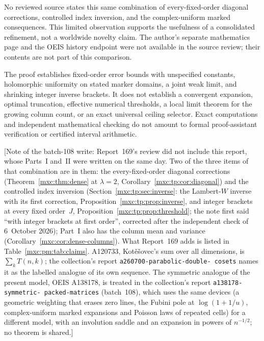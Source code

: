 \documentclass[11pt]{article}
\numberwithin{equation}{section}
\theoremstyle{definition}
\theoremstyle{remark}
\begin{document}
No reviewed source states this same combination of every-fixed-order diagonal
corrections, controlled index inversion, and the complex-uniform marked
consequences. This limited observation supports the usefulness of a
consolidated refinement, not a worldwide novelty claim. The author's separate
mathematics page and the OEIS history endpoint were not available in the
source review; their contents are not part of this comparison.

The proof establishes fixed-order error bounds with unspecified constants,
holomorphic uniformity on stated marker domains, a joint weak limit, and
shrinking integer inverse brackets. It does not establish a convergent
expansion, optimal truncation, effective numerical thresholds, a local limit
theorem for the growing column count, or an exact universal ceiling selector.
Exact computations and independent mathematical checking do not amount to
formal proof-assistant verification or certified interval arithmetic.

[Note of the batch-108 write: Report~169's review did not include this
report, whose Parts~I and~II were written on the same day. Two of the three
items of that combination are in them: the every-fixed-order diagonal
corrections (Theorem~\ref{mxc:thm:dense} at $\lambda=2$,
Corollary~\ref{mxc:tp:cor:diagonal}) and the controlled index inversion
(Section~\ref{mxc:tp:sec:inverse}: the Lambert-$W$ inverse with its first
correction, Proposition~\ref{mxc:tp:prop:inverse}, and integer brackets at
every fixed order~$J$, Proposition~\ref{mxc:tp:prop:threshold}; the note first
said ``with integer brackets at first order'', corrected after the
independent check of 6~October 2026); Part~I
also has the column mean and variance (Corollary~\ref{mxc:cor:dense-columns}).
What Report~169 adds is listed in Table~\ref{mxc:pm:tab:claims}. A120733,
Kot\v e\v sovec's sum over all dimensions, is $\sum_kT(n,k)$; the collection's
report \texttt{a260700-\allowbreak parabolic-\allowbreak double-\allowbreak
cosets} \cite{pdc} names it as the labelled analogue of its own sequence. The
symmetric analogue of the present model, OEIS A138178, is treated in the
collection's report \texttt{a138178-\allowbreak symmetric-\allowbreak
packed-\allowbreak matrices} \cite{pmspm} (batch~108), which uses the same
devices (a geometric weighting that erases zero lines, the Fubini pole at
$\log(1+1/u)$, complex-uniform marked expansions and Poisson laws of repeated
cells) for a different model, with an involution saddle and an expansion in
powers of $n^{-1/2}$; no theorem is shared.]
\end{document}
